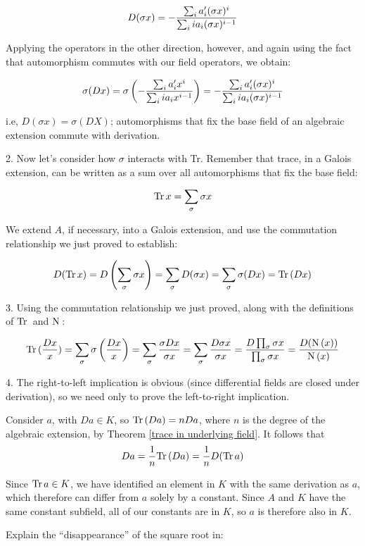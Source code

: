$$D(\sigma x) = - {\sum_i a_i' (\sigma x)^i \over {\sum_i i a_i (\sigma x)^{i-1}}} $$

Applying the operators in the other direction, however, and again using
the fact that automorphism commutes with our field operators, we obtain:

$$\sigma(D x) = \sigma\left(- {\sum_i a_i' x^i \over {\sum_i i a_i x^{i-1}}} \right)
= - {\sum_i a_i' (\sigma x)^i \over {\sum_i i a_i (\sigma x)^{i-1}}} $$

i.e, $D(\sigma x) = \sigma(D X)$; automorphisms that fix the base field
of an algebraic extension commute with derivation.

2. Now let's consider how $\sigma$ interacts with Tr.  Remember that
trace, in a Galois extension, can be written as a sum over all
automorphisms that fix the base field:

$${\rm Tr\,} x = \sum_\sigma \sigma x$$

We extend $A$, if necessary, into a Galois extension, and use
the commutation relationship we just proved to establish:

$$D({\rm Tr\,} x) = D\left(\sum_\sigma \sigma x\right) = \sum_\sigma D(\sigma x)
= \sum_\sigma \sigma(D x) = {\rm Tr\,}(D x)$$

3. Using the commutation relationship we just proved, along with the definitions of ${\rm Tr\,}$ and ${\rm N\,}$:

$${\rm Tr\,}(\frac{D x}{x}) = \sum_\sigma \sigma\left( \frac{D x}{x} \right) = \sum_\sigma \frac{\sigma D x}{\sigma x}
= \sum_\sigma \frac{D \sigma x}{\sigma x} = \frac{D \prod_\sigma \sigma x}{\prod_\sigma \sigma x} = \frac{D({\rm N\,}(x))}{{\rm N\,}(x)}$$

4. The right-to-left implication is obvious (since differential fields
are closed under derivation), so we need only to prove the
left-to-right implication.

Consider $a$, with $D a \in K$,
so ${\rm Tr\,}(D a) = n D a$, where $n$ is the degree of the algebraic extension,
by Theorem \ref{trace in underlying field}.
It follows that
$$D a = \frac{1}{n} {\rm Tr\,}(D a) = \frac{1}{n} D({\rm Tr\,} a)$$

Since ${\rm Tr\,} a \in K$, we have identified an
element in $K$ with the same derivation as $a$, which therefore can
differ from $a$ solely by a constant.  Since $A$ and $K$ have the same
constant subfield, all of our constants are in $K$, so $a$ is
therefore also in $K$.

\endtheorem

\example

Explain the ``disappearance'' of the square root in:

